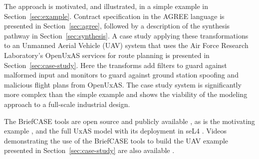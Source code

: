 The approach is motivated, and illustrated, in a simple example in Section~\ref{sec:example}. Contract specification in the AGREE language is presented in Section~\ref{sec:agree}, followed by a description of the synthesis pathway in Section~\ref{sec:synthesis}. A case study applying these transformations to an Unmanned Aerial Vehicle (UAV) system that uses the Air Force Research Laboratory's OpenUxAS services for route planning is presented in Section~\ref{sec:case-study}. Here the transforms add filters to guard against malformed input and monitors to guard against ground station spoofing and malicious flight plans from OpenUxAS. The case study system is significantly more complex than the simple example and shows the viability of the modeling approach to a full-scale industrial design. 

The BriefCASE tools are open source and publicly available \cite{fmide}, as is the motivating example \cite{repo}, and the full UxAS model with its deployment in seL4 \cite{phase2, camkes}.  Videos demonstrating the use of the BriefCASE tools to build the UAV example presented in Section~\ref{sec:case-study} are also available \cite{case}. 

